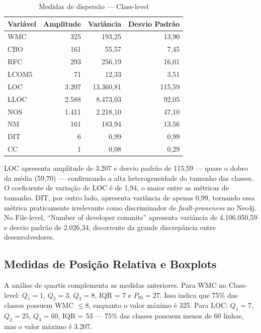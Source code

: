 \documentclass[12pt]{article}
\begin{document}
\begin{table}[H]
\centering
\caption{Medidas de dispersão --- Class-level}
\label{tab:dispersao_class}
\footnotesize
\begin{tabular}{lrrr}
\toprule
\textbf{Variável} & \textbf{Amplitude} & \textbf{Variância} & \textbf{Desvio Padrão} \\
\midrule
WMC   &     325 &      193,25 &  13,90 \\
CBO   &     161 &       55,57 &   7,45 \\
RFC   &     293 &      256,19 &  16,01 \\
LCOM5 &      71 &       12,33 &   3,51 \\
LOC   &   3.207 &   13.360,81 & 115,59 \\
LLOC  &   2.588 &    8.473,03 &  92,05 \\
NOS   &   1.411 &    2.218,10 &  47,10 \\
NM    &     161 &      183,94 &  13,56 \\
DIT   &       6 &        0,99 &   0,99 \\
CC    &       1 &        0,08 &   0,29 \\
\bottomrule
\end{tabular}
\end{table}

LOC apresenta amplitude de 3.207 e desvio padrão de 115,59 --- quase o dobro da média (59,70) --- confirmando a alta heterogeneidade do tamanho das classes. O coeficiente de variação de LOC é de 1,94, o maior entre as métricas de tamanho. DIT, por outro lado, apresenta variância de apenas 0,99, tornando essa métrica praticamente irrelevante como discriminador de \textit{fault-proneness} no Neo4j. No File-level, ``Number of developer commits'' apresenta variância de 4.106.050,59 e desvio padrão de 2.026,34, decorrente da grande discrepância entre desenvolvedores.

\subsection{Medidas de Posição Relativa e Boxplots}

A análise de quartis complementa as medidas anteriores. Para WMC no Class-level: $Q_1 = 1$, $Q_2 = 3$, $Q_3 = 8$, IQR = 7 e $P_{95} = 27$. Isso indica que 75\% das classes possuem WMC $\leq 8$, enquanto o valor máximo é 325. Para LOC: $Q_1 = 7$, $Q_2 = 25$, $Q_3 = 60$, IQR = 53 --- 75\% das classes possuem menos de 60 linhas, mas o valor máximo é 3.207.
\end{document}
